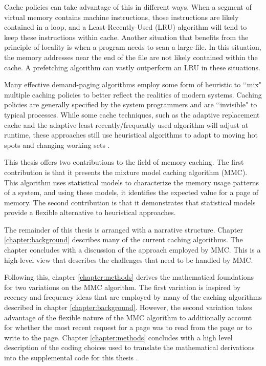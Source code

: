   Cache policies can take advantage of this in different ways. When a segment of
  virtual memory contains machine instructions, those instructions are likely
  contained in a loop, and a Least-Recently-Used (LRU) algorithm will tend to
  keep these instructions within cache. Another situation that benefits from the
  principle of locality is when a program needs to scan a large file. In this
  situation, the memory addresses near the end of the file are not likely
  contained within the cache. A prefetching algorithm can vastly outperform an
  LRU in these situations.

  Many effective demand-paging algorithms employ some form of heuristic to
  \lq\lq mix" multiple caching policies to better reflect the realities of
  modern systems. Caching policies are generally specified by the system
  programmers and are \lq\lq invisible" to typical processes. While some cache
  techniques, such as the adaptive replacement cache and the adaptive least
  recently/frequently used algorithm will adjust at runtime, these approaches
  still use heuristical algorithms to adapt to moving hot spots and changing
  working sets \cite{arc, kim2001lrfu}.

  This thesis offers two contributions to the field of memory caching. The first
  contribution is that it presents the mixture model caching algorithm (MMC).
  This algorithm uses statistical models to characterize the memory
  usage patterns of a system, and using these models, it identifies the expected
  value for a page of memory. The second contribution is that it demonstrates
  that statistical models provide a flexible alternative to heuristical
  approaches.

  The remainder of this thesis is arranged with a narrative structure. Chapter
  \ref{chapter:background} describes many of the current caching algorithms. The
  chapter concludes with a discussion of the approach employed by MMC. This is a
  high-level view that describes the challenges that need to be handled by MMC.

  Following this, chapter \ref{chapter:methods} derives the mathematical
  foundations for two variations on the MMC algorithm. The first variation is
  inspired by recency and frequency ideas that are employed by many of the
  caching algorithms described in chapter \ref{chapter:background}. However, the
  second variation takes advantage of the flexible nature of the MMC algorithm
  to additionally account for whether the most recent request for a page was to
  read from the page or to write to the page. Chapter \ref{chapter:methods}
  concludes with a high level description of the coding choices used to
  translate the mathematical derivations into the supplemental code for this
  thesis \cite{supplimental}.

